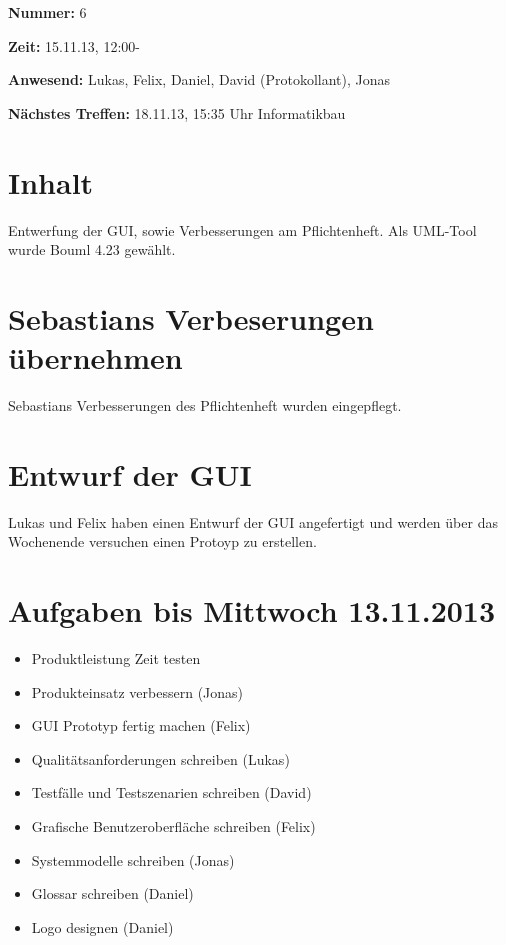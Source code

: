 \documentclass[a4paper]{article}
\begin{document}
\textbf{Nummer:} 6

\textbf{Zeit:} 15.11.13, 12:00-

\textbf{Anwesend:} Lukas, Felix, Daniel, David (Protokollant), Jonas

\textbf{Nächstes Treffen:} 18.11.13, 15:35 Uhr Informatikbau

\section{Inhalt}

Entwerfung der GUI, sowie Verbesserungen am Pflichtenheft. Als UML-Tool wurde Bouml 4.23 gewählt.

\section{Sebastians Verbeserungen übernehmen}

Sebastians Verbesserungen des Pflichtenheft wurden eingepflegt.

\section{Entwurf der GUI}

Lukas und Felix haben einen Entwurf der GUI angefertigt und werden über das Wochenende versuchen einen Protoyp zu erstellen.

\section{Aufgaben bis Mittwoch 13.11.2013}

\begin{itemize}
	\item Produktleistung Zeit testen
	\item Produkteinsatz verbessern (Jonas)
	\item GUI Prototyp fertig machen (Felix)
	\item Qualitätsanforderungen schreiben (Lukas)
	\item Testfälle und Testszenarien schreiben (David)
	\item Grafische Benutzeroberfläche schreiben (Felix)
	\item Systemmodelle schreiben (Jonas)
	\item Glossar schreiben (Daniel)
         \item Logo designen (Daniel)
         
\end{itemize}
\end{document}

